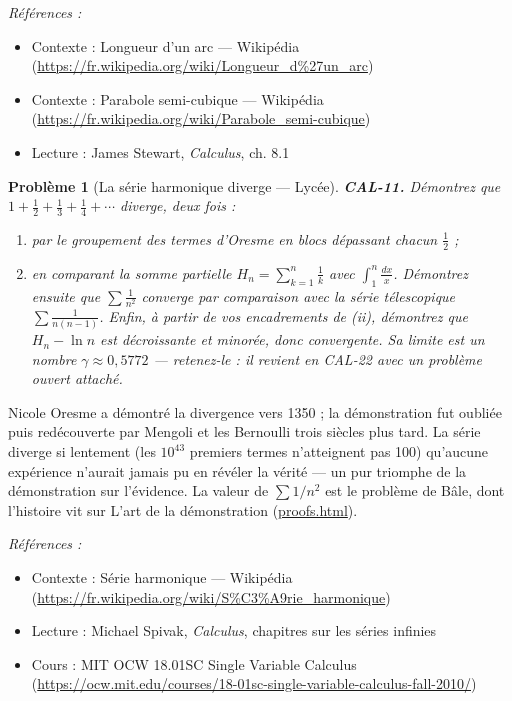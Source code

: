 \documentclass[11pt]{article}
\newtheorem{problem}{Problème}
\newenvironment{refs}{\par\small\noindent\emph{Références :}\begin{itemize}\setlength\itemsep{0pt}}{\end{itemize}\normalsize}
\begin{document}
\begin{refs}
\item Contexte : Longueur d'un arc --- Wikipédia (\url{https://fr.wikipedia.org/wiki/Longueur_d%27un_arc})
\item Contexte : Parabole semi-cubique --- Wikipédia (\url{https://fr.wikipedia.org/wiki/Parabole_semi-cubique})
\item Lecture : James Stewart, \textit{Calculus}, ch. 8.1
\end{refs}

\bigskip

\begin{problem}[{La série harmonique diverge --- Lycée}]
\textbf{CAL-11.} Démontrez que
$ 1 + \frac12 + \frac13 + \frac14 + \cdots $ diverge, deux fois :
\begin{enumerate}
\item[(i)] par le
groupement des termes d'Oresme en blocs dépassant chacun $ \frac12 $ ;
\item[(ii)] en comparant la somme
partielle $ H_n = \sum_{k=1}^n \frac1k $ avec $ \int_1^n \frac{dx}{x} $. Démontrez ensuite que
$ \sum \frac{1}{n^2} $ \textit{converge} par comparaison avec la série télescopique
$ \sum \frac{1}{n(n-1)} $. Enfin, à partir de vos encadrements de (ii), démontrez que
$ H_n - \ln n $ est décroissante et minorée, donc convergente. Sa limite est un nombre
$ \gamma \approx 0{,}5772 $ --- retenez-le : il revient en CAL-22 avec un problème ouvert
attaché.
\end{enumerate}

\end{problem}

\noindent Nicole Oresme a démontré la divergence vers 1350 ; la démonstration fut oubliée
puis redécouverte par Mengoli et les Bernoulli trois siècles plus tard. La série diverge
si lentement (les $ 10^{43} $ premiers termes n'atteignent pas 100) qu'aucune expérience n'aurait jamais
pu en révéler la vérité --- un pur triomphe de la démonstration sur l'évidence. La valeur de
$ \sum 1/n^2 $ est le problème de Bâle, dont l'histoire vit sur
L'art de la démonstration (\url{proofs.html}).

\begin{refs}
\item Contexte : Série harmonique --- Wikipédia (\url{https://fr.wikipedia.org/wiki/S%C3%A9rie_harmonique})
\item Lecture : Michael Spivak, \textit{Calculus}, chapitres sur les séries infinies
\item Cours : MIT OCW 18.01SC Single Variable Calculus (\url{https://ocw.mit.edu/courses/18-01sc-single-variable-calculus-fall-2010/})
\end{refs}
\end{document}
